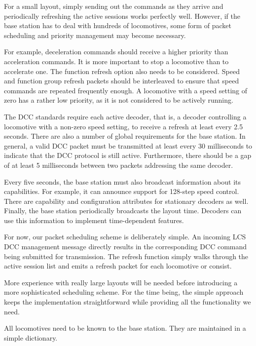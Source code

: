 For a small layout, simply sending out the commands as they arrive and periodically refreshing the active sessions works perfectly well. However, if the base station has to deal with hundreds of locomotives, some form of packet scheduling and priority management may become necessary.

For example, deceleration commands should receive a higher priority than acceleration commands. It is more important to stop a locomotive than to accelerate one. The function refresh option also needs to be considered. Speed and function group refresh packets should be interleaved to ensure that speed commands are repeated frequently enough. A locomotive with a speed setting of zero has a rather low priority, as it is not considered to be actively running.

The DCC standards require each active decoder, that is, a decoder controlling a locomotive with a non-zero speed setting, to receive a refresh at least every 2.5 seconds.
There are also a number of global requirements for the base station. In general, a valid DCC packet must be transmitted at least every 30 milliseconds to indicate that the DCC protocol is still active. Furthermore, there should be a gap of at least 5 milliseconds between two packets addressing the same decoder.

Every five seconds, the base station must also broadcast information about its capabilities. For example, it can announce support for 128-step speed control. There are capability and configuration attributes for stationary decoders as well. Finally, the base station periodically broadcasts the layout time. Decoders can use this information to implement time-dependent features.

For now, our packet scheduling scheme is deliberately simple. An incoming LCS DCC management message directly results in the corresponding DCC command being submitted for transmission. The refresh function simply walks through the active session list and emits a refresh packet for each locomotive or consist.

More experience with really large layouts will be needed before introducing a more sophisticated scheduling scheme. For the time being, the simple approach keeps the implementation straightforward while providing all the functionality we need.


All locomotives need to be known to the base station. They are maintained in a simple dictionary.

